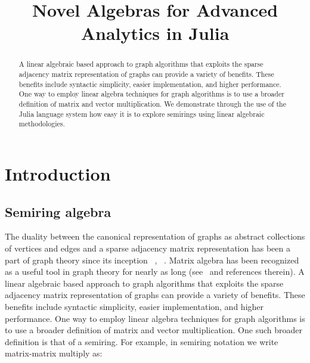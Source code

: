 \documentclass[conference]{IEEEtran}
\begin{document}
\title{Novel Algebras for Advanced Analytics in Julia}

\author{
}

\maketitle

\begin{abstract}
A linear algebraic
based approach to graph algorithms that exploits the sparse adjacency
matrix representation of graphs can provide a variety of
benefits. These benefits include syntactic simplicity, easier
implementation, and higher performance.  One way to employ linear
algebra techniques for graph algorithms is to use a broader definition
of matrix and vector multiplication.  We demonstrate through the use of the
Julia language system how easy it is to explore semirings using linear algebraic
methodologies.
\end{abstract}

\section{Introduction}

\subsection{Semiring algebra}

The duality between the canonical representation of graphs as abstract
collections of vertices and edges and a sparse adjacency matrix
representation has been a part of graph theory since its inception
~\cite{Konig1931}, ~\cite{Konig1936}. Matrix algebra has been
recognized as a useful tool in graph theory for nearly as long
(see~\cite{Harary1969} and references therein).  A linear algebraic
based approach to graph algorithms that exploits the sparse adjacency
matrix representation of graphs can provide a variety of
benefits. These benefits include syntactic simplicity, easier
implementation, and higher performance.  One way to employ linear
algebra techniques for graph algorithms is to use a broader definition
of matrix and vector multiplication. One such broader definition is
that of a semiring.  For example, in semiring notation we write
matrix-matrix multiply as:
\end{document}
